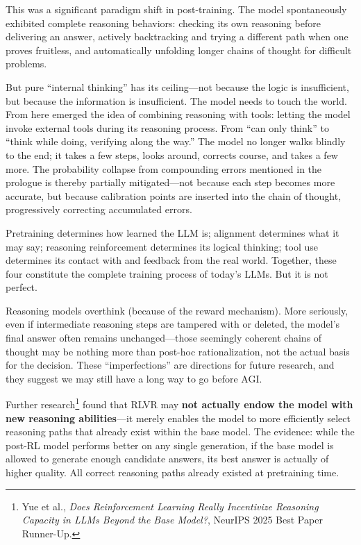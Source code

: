 This was a significant paradigm shift in post-training. The model spontaneously exhibited complete reasoning behaviors: checking its own reasoning before delivering an answer, actively backtracking and trying a different path when one proves fruitless, and automatically unfolding longer chains of thought for difficult problems.



\vspace{1em}

But pure ``internal thinking'' has its ceiling---not because the logic is insufficient, but because the information is insufficient. The model needs to touch the world. From here emerged the idea of combining reasoning with tools: letting the model invoke external tools during its reasoning process.
From ``can only think'' to ``think while doing, verifying along the way.'' The model no longer walks blindly to the end; it takes a few steps, looks around, corrects course, and takes a few more. The probability collapse from compounding errors mentioned in the prologue is thereby partially mitigated---not because each step becomes more accurate, but because calibration points are inserted into the chain of thought, progressively correcting accumulated errors.

\vspace{1em}

Pretraining determines how learned the LLM is; alignment determines what it may say; reasoning reinforcement determines its logical thinking; tool use determines its contact with and feedback from the real world. Together, these four constitute the complete training process of today's LLMs. But it is not perfect.

Reasoning models overthink (because of the reward mechanism). More seriously, even if intermediate reasoning steps are tampered with or deleted, the model's final answer often remains unchanged---those seemingly coherent chains of thought may be nothing more than post-hoc rationalization, not the actual basis for the decision.
These ``imperfections'' are directions for future research, and they suggest we may still have a long way to go before AGI.

\vspace{1em}

Further research\footnote{Yue et al., \textit{Does Reinforcement Learning Really Incentivize Reasoning Capacity in LLMs Beyond the Base Model?}, NeurIPS 2025 Best Paper Runner-Up.} found that RLVR may \textbf{not actually endow the model with new reasoning abilities}---it merely enables the model to more efficiently select reasoning paths that already exist within the base model. The evidence: while the post-RL model performs better on any single generation, if the base model is allowed to generate enough candidate answers, its best answer is actually of higher quality. All correct reasoning paths already existed at pretraining time.

